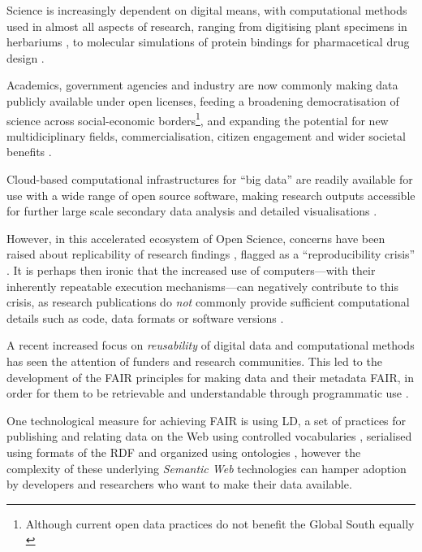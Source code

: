 Science is increasingly dependent on digital means, with computational methods used in almost all aspects of research, ranging from digitising plant specimens in herbariums \cite{Thiers 2016}, to molecular simulations of protein bindings for pharmacetical drug design \cite{Sledz 2018}. 

Academics, government agencies and industry are now commonly making data publicly available under open licenses, feeding a broadening democratisation of science \cite{Kitchin 2021} across social-economic borders\footnote{Although current open data practices do not benefit the Global South equally \cite{Serwadda 2018}}, and expanding the potential for new multidiciplinary fields, commercialisation, citizen engagement and wider societal benefits \cite{Bisol 2014}.

Cloud-based computational infrastructures for ``big data'' are readily available for use with a wide range of open source software, making research outputs accessible for further large scale secondary data analysis and detailed visualisations \cite{Hashem 2015}.

However, in this accelerated ecosystem of Open Science, concerns have been raised about replicability of research findings \cite{Ioannidis 2005}, flagged as a ``reproducibility crisis'' \cite{Baker 2016}. It is perhaps then ironic that the increased use of computers---with their inherently repeatable execution mechanisms---can negatively contribute to this crisis, as research publications do \emph{not} commonly provide sufficient computational details such as code, data formats or software versions \cite{Stodden 2016}.

A recent increased focus on \emph{reusability} of digital data and computational methods has seen the attention of funders and research communities. This led to the development of the \acrshort{FAIR} principles for making data and their metadata \acrlong{FAIR}, in order for them to be retrievable and understandable through programmatic use \cite{Wilkinson 2016}.

One technological measure for achieving FAIR is using \acrlong{LD}, a set of practices for publishing and relating data on the Web using controlled vocabularies \cite{Berners-Lee 2006}, serialised using formats of the \acrfull{RDF} \cite{Schreiber 2014} and organized using ontologies \cite{W3C 2012}, however the complexity of these underlying \emph{Semantic Web} technologies can hamper adoption by developers \cite{Klímek 2019} and researchers who want to make their data available.

